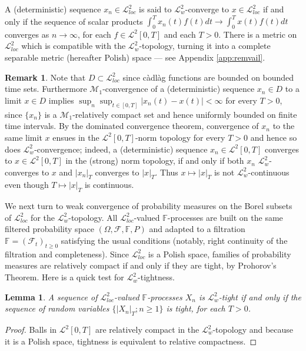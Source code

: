 \documentclass[final]{amsart}
\newtheorem{lem}[thm]{Lemma}
\theoremstyle{definition}
\newtheorem{rem}{Remark}[section]
\numberwithin{equation}{section}
\newcommand{\dF}{\ensuremath{\mathbb{F}}}
\newcommand{\cF}{\ensuremath{\mathcal{F}}}
\newcommand{\cL}{\ensuremath{\mathcal{L}}}
\begin{document}
A (deterministic) sequence $x_n\in\cL^2_{loc}$ is said to $\cL^2_w$-converge to $x\in\cL^2_{loc}$ if and only if the sequence of scalar products $\int_0^Tx_n(t)f(t)dt \to \int_0^Tx(t)f(t)dt$ converges as $n\to\infty$, for each $f\in \cL^2[0,T]$ and each $T>0$.
There is a metric on $\cL^2_{loc}$ which is compatible with the $\cL^2_w$-topology,
turning it into a complete separable metric (hereafter Polish) space --- see Appendix \ref{app:remvail}.

\begin{rem}\label{rem:DinsideL2}
Note that $D\subset\cL^2_{loc}$ since c\`adl\`ag functions are bounded on bounded time sets.
Furthermore $\mathcal{M}_1$-convergence of a (deterministic) sequence $x_n\in D$ to a limit $x\in D$
implies $\sup_n\sup_{t\in[0,T]}|x_n(t)-x(t)|<\infty$ for every $T>0$, since $\{x_n\}$ is a $\mathcal{M}_1$-relatively compact set
and hence uniformly bounded on finite time intervals.
By the dominated convergence theorem, convergence of $x_n$ to the same limit $x$ ensues in the
$\cL^2[0,T]$-norm topology for every $T>0$ and hence so does $\cL^2_w$-convergence; indeed,
a (deterministic) sequence $x_n\in\cL^2[0,T]$ converges to $x\in\cL^2[0,T]$ in the (strong) norm topology,
if and only if both $x_n$ $\cL^2_w$-converges to $x$ and $|x_n|_T$ converges to $|x|_T$.
Thus $x\mapsto|x|_T$ is not $\cL^2_w$-continuous even though $T\mapsto|x|_T$ is continuous.
\end{rem}

We next turn to weak convergence of probability measures on the Borel subsets of $\cL^2_{loc}$ for the $\cL^2_w$-topology.
All $\cL^2_{loc}$-valued $\mathbb{F}$-processes are built on the same filtered probability space $(\Omega,\cF,\dF, P)$ and
adapted to a filtration $\dF = (\cF_t)_{t\ge 0}$ satisfying the usual conditions (notably, right continuity of the filtration and completeness).
Since $\cL^2_{loc}$ is a Polish space, families of probability measures are relatively compact
if and only if they are tight, by Prohorov's Theorem. Here is a quick test for $\cL^2_w$-tightness.

\begin{lem}\label{lem:L2tightness}
A sequence of $\cL^2_{loc}$-valued $\mathbb{F}$-processes $X_n$ is $\cL^2_w$-tight if and only if
the sequence of random variables $\bigl\{|X_n|_T; n\ge1\bigr\}$ is tight, for each $T>0$.
\end{lem}

\begin{proof}
Balls in $\cL^2[0,T]$ are relatively compact in the $\cL^2_w$-topology and because it is a Polish space, tightness is equivalent to relative compactness.
\end{proof}
\end{document}
